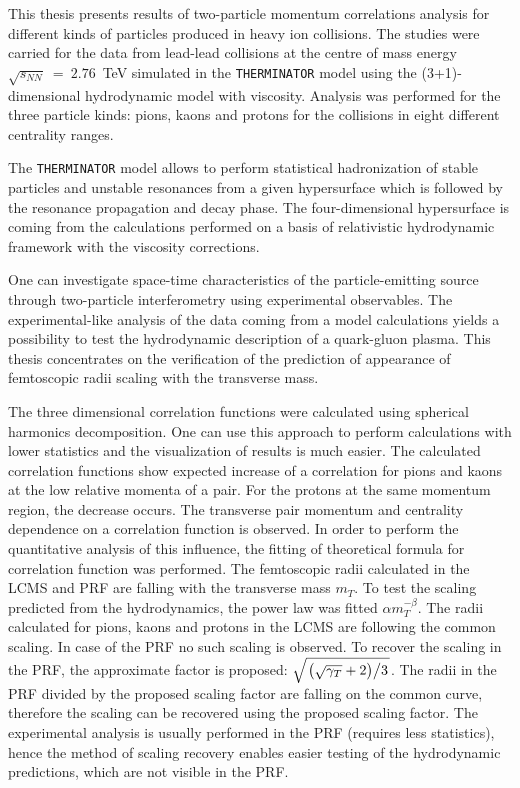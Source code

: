 This thesis presents results of two-particle momentum correlations analysis for different kinds of particles produced in heavy ion collisions.
The studies were carried for the data from lead-lead collisions at the centre of mass energy $\sqrt{s_{NN}}~=~2.76$~TeV simulated in the \verb|THERMINATOR| model using the (3+1)-dimensional hydrodynamic model with viscosity.
Analysis was performed for the three particle kinds: pions, kaons and protons for the collisions in eight different centrality ranges.

The \verb|THERMINATOR| model allows to perform statistical hadronization of stable particles and unstable resonances from a given hypersurface which is followed by the resonance propagation and decay phase.
The four-dimensional hypersurface is coming from the calculations performed on a basis of relativistic hydrodynamic framework with the viscosity corrections.

One can investigate space-time characteristics of the particle-emitting source through two-particle interferometry using experimental observables.
The experimental-like analysis of the data coming from a model calculations yields a possibility to test the hydrodynamic description of a quark-gluon plasma.
This thesis concentrates on the verification of the prediction of appearance of femtoscopic radii scaling with the transverse mass.

The three dimensional correlation functions were calculated using spherical harmonics decomposition.
One can use this approach to perform calculations with lower statistics and the visualization of results is much easier.
The calculated correlation functions show expected increase of a correlation for pions and kaons at the low relative momenta of a pair.
For the protons at the same momentum region, the decrease occurs.
The transverse pair momentum and centrality dependence on a correlation function is observed.
In order to perform the quantitative analysis of this influence, the fitting of theoretical formula for correlation function was performed.
The femtoscopic radii calculated in the LCMS and PRF are falling with the transverse mass $m_T$.
To test the scaling predicted from the hydrodynamics, the power law was fitted $\alpha m_T^{-\beta}$.
The radii calculated for pions, kaons and protons in the LCMS are following the common scaling.
In case of the PRF no such scaling is observed.
To recover the scaling in the PRF, the approximate factor is proposed: $\sqrt{ \left. \left( \sqrt{\gamma_T} + 2 \right) \middle/ 3 \right. }$.
The radii in the PRF divided by the proposed scaling factor are falling on the common curve, therefore the scaling can be recovered using the proposed scaling factor.
The experimental analysis is usually performed in the PRF (requires less statistics), hence the method of scaling recovery enables easier testing of the hydrodynamic predictions, which are not visible in the PRF.
